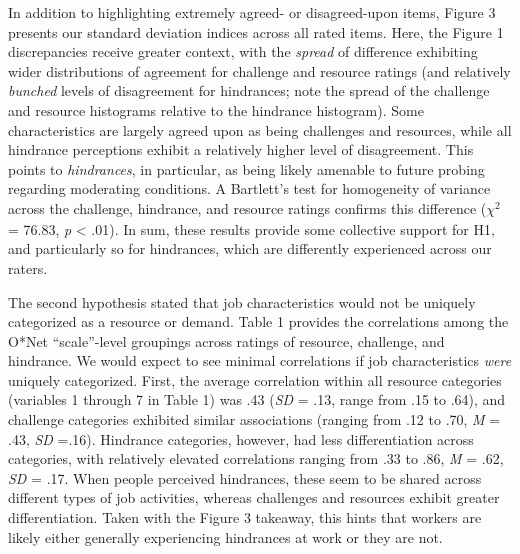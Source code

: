 \documentclass[
  man,mask]{apa6}
\begin{document}
In addition to highlighting extremely agreed- or disagreed-upon items, Figure 3 presents our standard deviation indices across all rated items. Here, the Figure 1 discrepancies receive greater context, with the \emph{spread} of difference exhibiting wider distributions of agreement for challenge and resource ratings (and relatively \emph{bunched} levels of disagreement for hindrances; note the spread of the challenge and resource histograms relative to the hindrance histogram). Some characteristics are largely agreed upon as being challenges and resources, while all hindrance perceptions exhibit a relatively higher level of disagreement. This points to \emph{hindrances}, in particular, as being likely amenable to future probing regarding moderating conditions. A Bartlett's test for homogeneity of variance across the challenge, hindrance, and resource ratings confirms this difference (\(\chi^2_{}\) = 76.83, \emph{p} \textless{} .01). In sum, these results provide some collective support for H1, and particularly so for hindrances, which are differently experienced across our raters.

The second hypothesis stated that job characteristics would not be uniquely categorized as a resource or demand. Table 1 provides the correlations among the O*Net ``scale''-level groupings across ratings of resource, challenge, and hindrance. We would expect to see minimal correlations if job characteristics \emph{were} uniquely categorized. First, the average correlation within all resource categories (variables 1 through 7 in Table 1) was .43 (\emph{SD} = .13, range from .15 to .64), and challenge categories exhibited similar associations (ranging from .12 to .70, \emph{M} = .43, \emph{SD} =.16). Hindrance categories, however, had less differentiation across categories, with relatively elevated correlations ranging from .33 to .86, \emph{M} = .62, \emph{SD} = .17. When people perceived hindrances, these seem to be shared across different types of job activities, whereas challenges and resources exhibit greater differentiation. Taken with the Figure 3 takeaway, this hints that workers are likely either generally experiencing hindrances at work or they are not.
\end{document}
